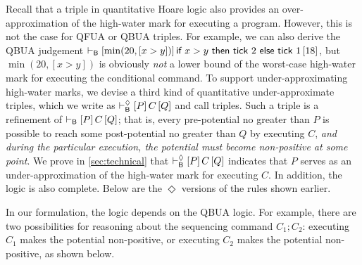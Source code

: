 Recall that a triple in quantitative Hoare logic also provides an over-approximation of the high-water mark for executing a program.
%
However, this is not the case for QFUA or QBUA triples.
%
For example, we can also derive the QBUA judgement $\vdash_{\mathsf{B}}\left[\min(20,[x>y])\right]\textsf{if}~x>y~\textsf{then}~\textsf{tick}~2~\textsf{else}~\textsf{tick}~1\left[18\right]$, but $\min(20,[x>y])$ is obviously \emph{not} a lower bound of the worst-case high-water mark for executing the conditional command.
%
To support under-approximating high-water marks, we devise a third kind of quantitative under-approximate triples, which we write as $\vdash^{\Diamond}_{\mathsf{B}}\left[P\right]C\left[Q\right]$ and call \QBUAd triples.
%
Such a triple is a refinement of $\vdash_{\mathsf{B}}\left[P\right]C\left[Q\right]$; that is, every pre-potential no greater than $P$ is possible to reach some post-potential no greater than $Q$ by executing $C$, \emph{and during the particular execution, the potential must become non-positive at some point}.
%
We prove in \cref{sec:technical} that $\vdash^{\Diamond}_{\mathsf{B}}\left[P\right]C\left[Q\right]$ indicates that $P$ serves as an under-approximation of the high-water mark for executing $C$.
%
In addition, the \QBUAd logic is also complete.
%
Below are the $\Diamond$ versions of the rules shown earlier.
%
%
In our formulation, the \QBUAd logic depends on the QBUA logic.
%
For example, there are two possibilities for reasoning about the sequencing command $C_1;C_2$: executing $C_1$ makes the potential non-positive, or executing $C_2$ makes the potential non-positive, as shown below.
%
